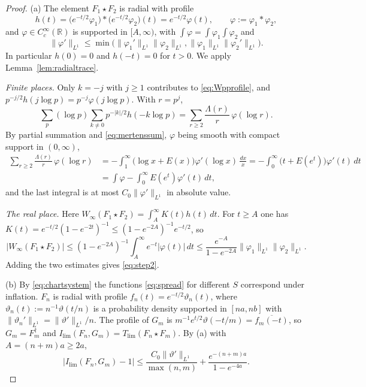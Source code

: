 \documentclass[11pt]{amsart}
\theoremstyle{definition}
\theoremstyle{remark}
\newcommand{\R}{\mathbb R}
\begin{document}
\begin{proof}
(a)  The element $F_1\star F_2$ is radial with profile
\begin{equation}\label{eq:profileconv}
h(t)=\bigl(e^{-t/2}\varphi_1\bigr)*\bigl(e^{-t/2}\varphi_2\bigr)(t)
=e^{-t/2}\varphi(t),\qquad\varphi:=\varphi_1*\varphi_2 ,
\end{equation}
and $\varphi\in C_c^{\infty}(\R)$ is supported in $[A,\infty)$, with
$\int\varphi=\int\varphi_1\int\varphi_2$ and
\[
\lVert\varphi'\rVert_{L^1}\le\min\bigl(\lVert\varphi_1'\rVert_{L^1}
\lVert\varphi_2\rVert_{L^1},\lVert\varphi_1\rVert_{L^1}
\lVert\varphi_2'\rVert_{L^1}\bigr).
\]
In particular $h(0)=0$ and $h(-t)=0$ for
$t>0$.  We apply Lemma~\ref{lem:radialtrace}.

\emph{Finite places.}  Only $k=-j$ with $j\ge1$ contributes to
\eqref{eq:Wpprofile}, and
$p^{-j/2}h(j\log p)=p^{-j}\varphi(j\log p)$.  With $r=p^{j}$,
\[
\sum_p(\log p)\sum_{k\ne0}p^{-|k|/2}h(-k\log p)
=\sum_{r\ge2}\frac{\Lambda(r)}{r}\,\varphi(\log r).
\]
By partial summation and \eqref{eq:mertenssum}, $\varphi$ being smooth with
compact support in $(0,\infty)$,
\begin{align*}
\sum_{r\ge2}\frac{\Lambda(r)}{r}\,\varphi(\log r)
&=-\int_1^{\infty}\bigl(\log x+E(x)\bigr)\varphi'(\log x)\,\frac{dx}{x}
=-\int_0^{\infty}\bigl(t+E(e^{t})\bigr)\varphi'(t)\,dt\\
&=\int\varphi-\int_0^{\infty}E(e^{t})\varphi'(t)\,dt ,
\end{align*}
and the last integral is at most $C_0\lVert\varphi'\rVert_{L^1}$ in absolute
value.

\emph{The real place.}  Here $W_{\infty}(F_1\star F_2)=\int_A^{\infty}K(t)h(t)
\,dt$.  For $t\ge A$ one has
$K(t)=e^{-t/2}(1-e^{-2t})^{-1}\le(1-e^{-2A})^{-1}e^{-t/2}$, so
\[
|W_{\infty}(F_1\star F_2)|\le(1-e^{-2A})^{-1}\int_A^{\infty}
e^{-t}|\varphi(t)|\,dt\le\frac{e^{-A}}{1-e^{-2A}}
\lVert\varphi_1\rVert_{L^1}\lVert\varphi_2\rVert_{L^1}.
\]
Adding the two estimates gives \eqref{eq:step2}.

(b)  By \eqref{eq:chartsystem} the functions \eqref{eq:spread} for different
$S$ correspond under inflation.  $F_n$ is radial with profile
$f_n(t)=e^{-t/2}\vartheta_n(t)$, where
$\vartheta_n(t):=n^{-1}\vartheta(t/n)$ is a probability density supported in
$[na,nb]$ with $\lVert\vartheta_n'\rVert_{L^1}=\lVert\vartheta'\rVert_{L^1}/n$.
The profile of $G_m$ is $m^{-1}e^{t/2}\vartheta(-t/m)=\overline{f_m(-t)}$, so
$G_m=F_m^{\dagger}$ and $I_{\lim}(F_n,G_m)=T_{\lim}(F_n\star F_m)$.  By (a)
with $A=(n+m)a\ge2a$,
\[
\bigl|I_{\lim}(F_n,G_m)-1\bigr|\le
\frac{C_0\lVert\vartheta'\rVert_{L^1}}{\max(n,m)}
+\frac{e^{-(n+m)a}}{1-e^{-4a}} .
\]


\end{proof}
\end{document}
